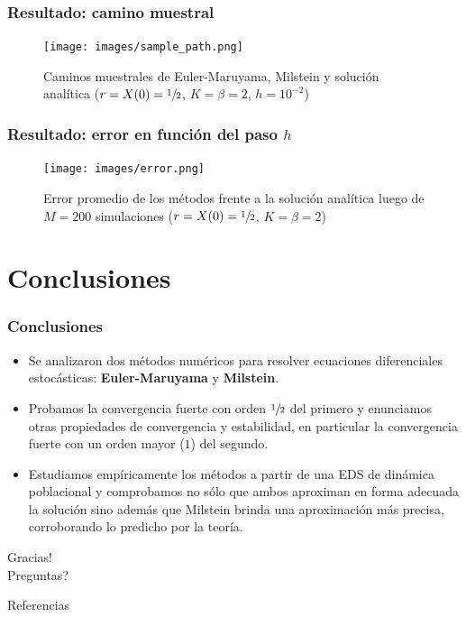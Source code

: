 \documentclass[10pt]{beamer}
\begin{document}
\frame
{
    \frametitle{Resultado: camino muestral}

    \begin{center}
    \begin{figure}[h!]
    \centerline{
        \texttt{[image: images/sample\_path.png]}
    }
        \caption{Caminos muestrales de Euler-Maruyama, Milstein y solución analítica ($r = X(0) = \sfrac{1}{2}$, $K = \beta = 2$, $h = 10^{-2}$)}
    \end{figure}
    \end{center}
}

\frame
{
    \frametitle{Resultado: error en función del paso $h$}

    \begin{center}
    \begin{figure}[h!]
    \centerline{
        \texttt{[image: images/error.png]}
    }
        \caption{Error promedio de los métodos frente a la solución analítica luego de $M = 200$ simulaciones ($r = X(0) = \sfrac{1}{2}$, $K = \beta = 2$)}
    \end{figure}
    \end{center}
}

\section{Conclusiones}

\frame
{
    \frametitle{Conclusiones}

    \begin{itemize}
        \item Se analizaron dos métodos numéricos para resolver ecuaciones diferenciales estocásticas: 
        \textbf{Euler-Maruyama} y \textbf{Milstein}.
        \item Probamos la convergencia fuerte con orden $\sfrac{1}{2}$ del primero y enunciamos
        otras propiedades de convergencia y estabilidad, en particular 
        la convergencia fuerte con un orden mayor ($1$) del segundo.
        \item Estudiamos empíricamente los métodos a partir de una EDS de dinámica poblacional
        y comprobamos no sólo que ambos aproximan en forma adecuada la solución sino además que
        Milstein brinda una aproximación más precisa, corroborando lo predicho por la teoría. 
    \end{itemize}
}



\begin{frame}[standout]
  Gracias!\\
  
  Preguntas?
\end{frame}

\nocite{*}
\begin{frame}[allowframebreaks]{Referencias}
  
  
\end{frame}
\end{document}
